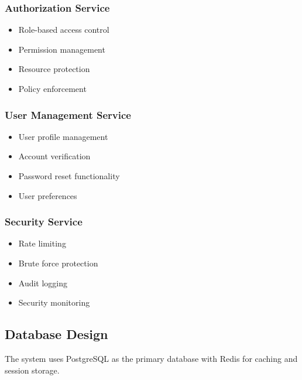 \documentclass[12pt,a4paper]{article}
\begin{document}
\subsubsection{Authorization Service}
\begin{itemize}
    \item Role-based access control
    \item Permission management
    \item Resource protection
    \item Policy enforcement
\end{itemize}

\subsubsection{User Management Service}
\begin{itemize}
    \item User profile management
    \item Account verification
    \item Password reset functionality
    \item User preferences
\end{itemize}

\subsubsection{Security Service}
\begin{itemize}
    \item Rate limiting
    \item Brute force protection
    \item Audit logging
    \item Security monitoring
\end{itemize}

\subsection{Database Design}

The system uses PostgreSQL as the primary database with Redis for caching and session storage.
\end{document}
